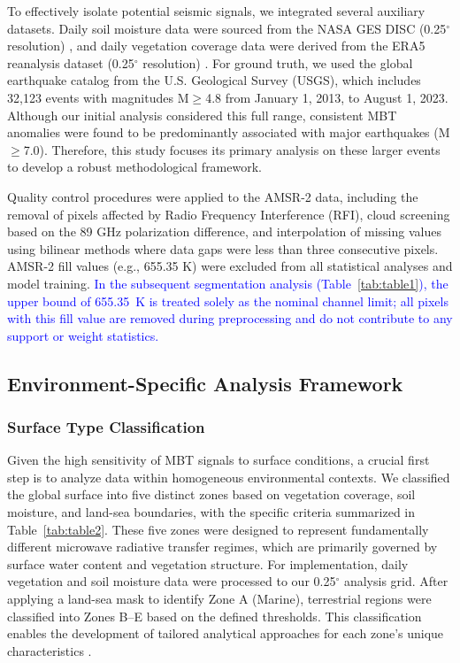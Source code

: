 \documentclass[preprint,review,12pt,authoryear]{elsarticle}
\providecommand{\DIFaddtex}[1]{{\sf #1}} %
\providecommand{\DIFaddbegin}{} %
\providecommand{\DIFaddend}{} %
\providecommand{\DIFadd}[1]{\texorpdfstring{\DIFaddtex{#1}}{#1}} %
\newcommand{\DIFaddincludegraphics}[2][]{{\color{blue}\fbox{\DIFOincludegraphics[#1]{#2}}}} %
\DeclareRobustCommand{\DIFaddbegin}{\DIFOaddbegin \let\includegraphics\DIFaddincludegraphics} %
\DeclareRobustCommand{\DIFaddend}{\DIFOaddend \let\includegraphics\DIFOincludegraphics} %
\renewcommand{\DIFaddtex}[1]{\textcolor{blue}{#1}}
\begin{document}
To effectively isolate potential seismic signals, we integrated several auxiliary datasets. Daily soil moisture data were sourced from the NASA GES DISC (0.25$^{\circ}$ resolution) \citep{fangGlobalLandData2009}, and daily vegetation coverage data were derived from the ERA5 reanalysis dataset (0.25$^{\circ}$ resolution) \citep{hersbachERA5GlobalReanalysis2020,munoz-sabaterERA5landStateoftheartGlobal2021}. For ground truth, we used the global earthquake catalog from the U.S. Geological Survey (USGS), which includes 32,123 events with magnitudes M$\ge$4.8 from January 1, 2013, to August 1, 2023. Although our initial analysis considered this full range, consistent MBT anomalies were found to be predominantly associated with major earthquakes (M$\ge$7.0). Therefore, this study focuses its primary analysis on these larger events to develop a robust methodological framework.

Quality control procedures were applied to the AMSR-2 data, including the removal of pixels affected by Radio Frequency Interference (RFI), cloud screening based on the 89 GHz polarization difference, and interpolation of missing values using bilinear methods where data gaps were less than three consecutive pixels. AMSR-2 fill values (e.g., 655.35 K) were excluded from all statistical analyses and model training. \DIFaddbegin \DIFadd{In the subsequent segmentation analysis (Table~\ref{tab:table1}), the upper bound of 655.35~K is treated solely as the nominal channel limit; all pixels with this fill value are removed during preprocessing and do not contribute to any support or weight statistics.
}\DIFaddend 

\subsection{Environment-Specific Analysis Framework}\label{sec:env_framework}

\subsubsection{Surface Type Classification}\label{sec:surface_classification}
Given the high sensitivity of MBT signals to surface conditions, a crucial first step is to analyze data within homogeneous environmental contexts. We classified the global surface into five distinct zones based on vegetation coverage, soil moisture, and land-sea boundaries, with the specific criteria summarized in Table~\ref{tab:table2}. These five zones were designed to represent fundamentally different microwave radiative transfer regimes, which are primarily governed by surface water content and vegetation structure. For implementation, daily vegetation and soil moisture data were processed to our 0.25$^{\circ}$ analysis grid. After applying a land-sea mask to identify Zone A (Marine), terrestrial regions were classified into Zones B--E based on the defined thresholds. This classification enables the development of tailored analytical approaches for each zone's unique characteristics \citep{oweMethodologySurfaceSoil2001}.
\end{document}
